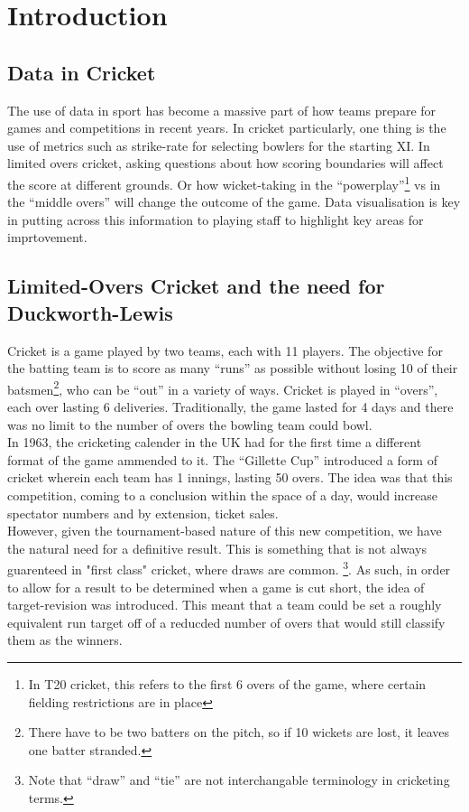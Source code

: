 \chapter{Introduction}

\section{Data in Cricket}
The use of data in sport has become a massive part of how teams prepare for games and competitions in recent years. In cricket particularly, one thing is the use
of metrics such as strike-rate for selecting bowlers for the starting XI. In limited overs cricket, asking questions about how scoring boundaries will affect
the score at different grounds. Or how wicket-taking in the ``powerplay''\footnote{In T20 cricket, this refers to the first 6 overs of the game, where certain fielding restrictions are in place}
vs in the ``middle overs'' will change the outcome of the game. Data visualisation is key in putting across this information to playing staff to highlight key areas for
imprtovement. 

\section{Limited-Overs Cricket and the need for Duckworth-Lewis}
Cricket is a game played by two teams, each with 11 players. The objective for the batting team is to score as many ``runs'' as possible
without losing 10 of their batsmen\footnote{There have to be two batters on the pitch, so if 10 wickets are lost, it leaves one batter stranded.}, 
who can be ``out'' in a variety of ways. Cricket is played in ``overs'', each over lasting 6 deliveries. Traditionally, the game lasted for 4 days
and there was no limit to the number of overs the bowling team could bowl. \\

In 1963, the cricketing calender in the UK had for the first time a different format of the game ammended to it.
The ``Gillette Cup'' introduced a form of cricket wherein each team has 1 innings, lasting 50 overs. The idea was 
that this competition, coming to a conclusion within the space of a day, would increase spectator numbers and by extension,
ticket sales.\\

However, given the tournament-based nature of this new competition, we have the natural need for a definitive result.
This is something that is not always guarenteed in "first class" cricket, where draws are common. \footnote{Note that 
``draw'' and ``tie'' are not interchangable terminology in cricketing terms.}. As such, in order to allow for a result to be
determined when a game is cut short, the idea of target-revision was introduced. This meant that a team could be set a
roughly equivalent run target off of a reducded number of overs that would still classify them as the winners.

